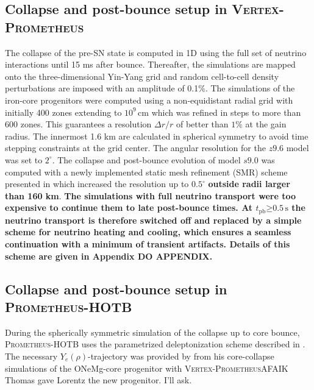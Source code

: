 \documentclass[fleqn,usenatbib]{mnras}
\newcommand{\tpb}{\ensuremath{t_{\text{pb}}}}
\newcommand{\s}{\ensuremath{\text{s}}}
\newcommand{\prom}{\textsc{Prometheus-HOTB}\xspace}
\newcommand{\vertexprom}{\textsc{Vertex-Prometheus}\xspace}
\newcommand{\COM}[1]{{\color{orange}#1}}
\begin{document}
\subsection{Collapse and post-bounce setup in \vertexprom}
\label{sec:Collapse and post-bounce setup in vertexprom}
The collapse of the pre-SN state is computed in 1D using the full set of neutrino interactions until 15 ms after bounce. Thereafter, the simulations are mapped onto the three-dimensional Yin-Yang grid and random cell-to-cell density perturbations are imposed with an amplitude of 0.1\%. 
The simulations of the iron-core progenitors were computed using a non-equidistant radial grid with initially 400 zones extending to $10^9\,\text{cm}$ which was refined in steps to more than 600 zones. This guarantees a resolution $\Delta r/r$ of better than $1\%$ at the gain radius. The innermost 1.6 km are calculated in spherical symmetry to avoid time stepping constraints at the grid center.
The angular resolution for the $z9.6$ model was set to $2^{\circ}$. 
The collapse and post-bounce evolution of model $s9.0$ was computed with a newly implemented static mesh refinement (SMR) scheme presented in \cite{Melson2019} which increased the resolution up to $0.5^{\circ}$ \textbf{outside radii larger than 160 km}.
\textbf{The simulations with full neutrino transport were too expensive to continue them to late post-bounce times. At $\tpb \mathord{\ge} 0.5\,\s$ the neutrino transport is therefore switched off and replaced by a simple scheme for neutrino heating and cooling, which ensures a seamless continuation with a minimum of transient artifacts. Details of this scheme are given in Appendix \COM{DO APPENDIX}.}

\subsection{Collapse and post-bounce setup in \prom}
\label{sec:Collapse and post-bounce setup in prom}
During the spherically symmetric simulation of the collapse up to core bounce, \prom uses the parametrized deleptonization scheme described in \citet{Liebendoerfer2005}. The necessary $Y_{e}(\rho)$-trajectory was provided by \cite{Huedepohl2018} from his core-collapse simulations of the ONeMg-core progenitor with \vertexprom \COM{AFAIK Thomas gave Lorentz the new progenitor. I'll ask}.
\end{document}
